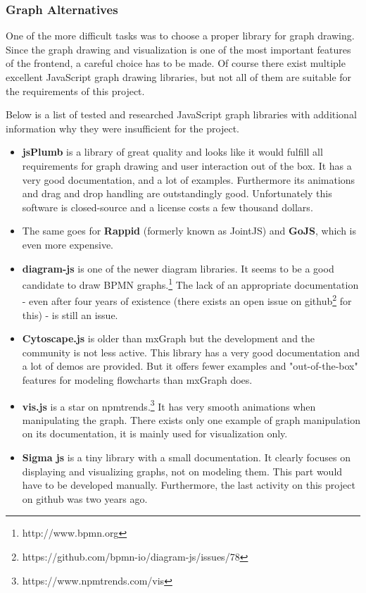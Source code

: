 \documentclass[a4paper,12pt,pdftex,halfparskip,cleardoubleempty,bibtotoc,liststotoc]{scrbook}
\begin{document}
\label{sec:graph-alternatives}
\subsubsection{Graph Alternatives}

One of the more difficult tasks was to choose a proper library for graph drawing. Since the graph drawing and visualization is one of the most important features of the frontend, a careful choice has to be made. Of course there exist multiple excellent JavaScript graph drawing libraries, but not all of them are suitable for the requirements of this project.

Below is a list of tested and researched JavaScript graph libraries with additional information why they were insufficient for the project.
\begin{itemize}
	\item \textbf{jsPlumb} is a library of great quality and looks like it would fulfill all  requirements for graph drawing and user interaction out of the box. It has a very good documentation, and a lot of examples. Furthermore its animations and drag and drop handling are outstandingly good. Unfortunately this software is closed-source and a license costs a few thousand dollars.
	\item The same goes for \textbf{Rappid} (formerly known as JointJS) and \textbf{GoJS}, which is even more expensive.
	\item \textbf{diagram-js} is one of the newer diagram libraries. It seems to be a good candidate to draw BPMN graphs.\footnote{http://www.bpmn.org} The lack of an appropriate documentation - even after four years of existence (there exists an open issue on github\footnote{https://github.com/bpmn-io/diagram-js/issues/78} for this) - is still an issue.
	\item \textbf{Cytoscape.js} is older than mxGraph but the development and the community is not less active. This library has a very good documentation and a lot of demos are provided. But it offers fewer examples and "out-of-the-box" features for modeling flowcharts than mxGraph does.
	\item \textbf{vis.js} is a star on npmtrends.\footnote{https://www.npmtrends.com/vis}  It has very smooth animations when manipulating the graph. There exists only one example of graph manipulation on its documentation, it is mainly used for visualization only.
	\item \textbf{Sigma js} is a tiny library with a small documentation. It clearly focuses on displaying and visualizing graphs, not on modeling them. This part would have to be developed manually. Furthermore, the last activity on this project on github was two years ago.
\end{itemize}
\end{document}
